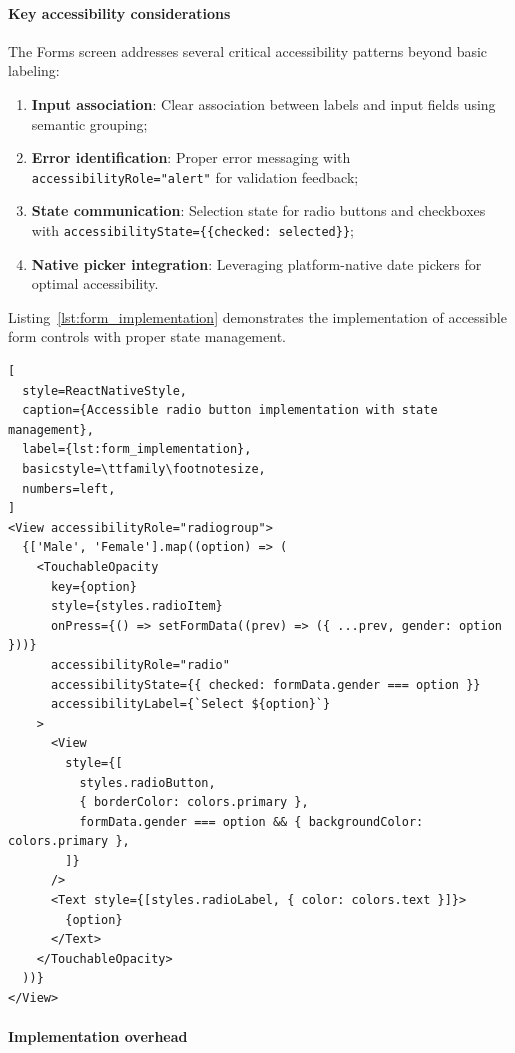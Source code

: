 \paragraph{Key accessibility considerations}

The Forms screen addresses several critical accessibility patterns beyond basic labeling:

\begin{enumerate}
    \item \textbf{Input association}: Clear association between labels and input fields using semantic grouping;
    
    \item \textbf{Error identification}: Proper error messaging with \texttt{accessibilityRole="alert"} for validation feedback;
    
    \item \textbf{State communication}: Selection state for radio buttons and checkboxes with \texttt{accessibilityState=\{\{checked: selected\}\}};
    
    \item \textbf{Native picker integration}: Leveraging platform-native date pickers for optimal accessibility.
\end{enumerate}

Listing~\ref{lst:form_implementation} demonstrates the implementation of accessible form controls with proper state management.

\begin{lstlisting}[
  style=ReactNativeStyle,
  caption={Accessible radio button implementation with state management},
  label={lst:form_implementation},
  basicstyle=\ttfamily\footnotesize,
  numbers=left,
]
<View accessibilityRole="radiogroup">
  {['Male', 'Female'].map((option) => (
    <TouchableOpacity
      key={option}
      style={styles.radioItem}
      onPress={() => setFormData((prev) => ({ ...prev, gender: option }))}
      accessibilityRole="radio"
      accessibilityState={{ checked: formData.gender === option }}
      accessibilityLabel={`Select ${option}`}
    >
      <View
        style={[
          styles.radioButton,
          { borderColor: colors.primary },
          formData.gender === option && { backgroundColor: colors.primary },
        ]}
      />
      <Text style={[styles.radioLabel, { color: colors.text }]}>
        {option}
      </Text>
    </TouchableOpacity>
  ))}
</View>
\end{lstlisting}

\paragraph{Implementation overhead}

